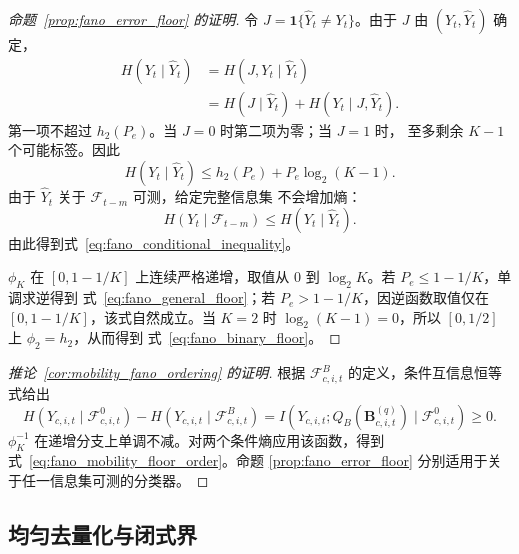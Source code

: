 \begin{proof}[命题~\ref{prop:fano_error_floor} 的证明]
令 \(J=\mathbf 1\{\widehat Y_t\neq Y_t\}\)。由于 \(J\) 由
\((Y_t,\widehat Y_t)\) 确定，
\begin{align*}
H(Y_t\mid\widehat{Y}_t)
&=
H(J,Y_t\mid\widehat{Y}_t)\\
&=
H(J\mid\widehat{Y}_t)
+
H(Y_t\mid J,\widehat{Y}_t).
\end{align*}
第一项不超过 \(h_2(P_e)\)。当 \(J=0\) 时第二项为零；当 \(J=1\) 时，
至多剩余 \(K-1\) 个可能标签。因此
\[
H(Y_t\mid\widehat{Y}_t)
\leq
h_2(P_e)+P_e\log_2(K-1).
\]
由于 \(\widehat Y_t\) 关于 \(\mathcal F_{t-m}\) 可测，给定完整信息集
不会增加熵：
\[
H(Y_t\mid\mathcal{F}_{t-m})
\leq
H(Y_t\mid\widehat{Y}_t).
\]
由此得到式~\eqref{eq:fano_conditional_inequality}。

\(\phi_K\) 在 \([0,1-1/K]\) 上连续严格递增，取值从 \(0\) 到
\(\log_2K\)。若 \(P_e\leq1-1/K\)，单调求逆得到
式~\eqref{eq:fano_general_floor}；若 \(P_e>1-1/K\)，因逆函数取值仅在
\([0,1-1/K]\)，该式自然成立。当 \(K=2\) 时
\(\log_2(K-1)=0\)，所以 \([0,1/2]\) 上 \(\phi_2=h_2\)，从而得到
式~\eqref{eq:fano_binary_floor}。
\end{proof}

\begin{proof}[推论~\ref{cor:mobility_fano_ordering} 的证明]
根据 \(\mathcal F^B_{c,i,t}\) 的定义，条件互信息恒等式给出
\[
H(Y_{c,i,t}\mid\mathcal{F}^{0}_{c,i,t})
-
H(Y_{c,i,t}\mid\mathcal{F}^{B}_{c,i,t})
=
I\!\left(
Y_{c,i,t};
Q_B(\mathbf{B}^{(q)}_{c,i,t})
\mid\mathcal{F}^{0}_{c,i,t}
\right)
\geq0.
\]
\(\phi_K^{-1}\) 在递增分支上单调不减。对两个条件熵应用该函数，得到
式~\eqref{eq:fano_mobility_floor_order}。命题
\ref{prop:fano_error_floor} 分别适用于关于任一信息集可测的分类器。
\end{proof}

\subsection{均匀去量化与闭式界}

